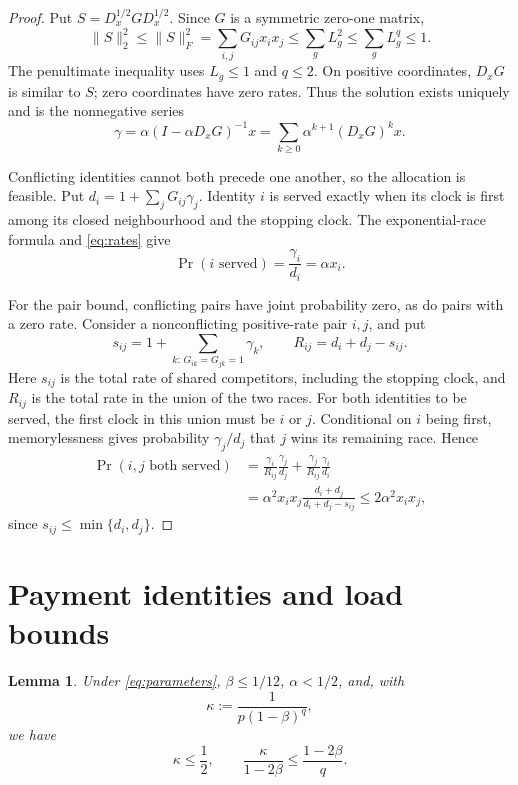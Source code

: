 \documentclass[11pt]{article}
\newtheorem{lemma}[theorem]{Lemma}
\begin{document}
\begin{proof}
Put $S=D_x^{1/2}GD_x^{1/2}$.
Since $G$ is a symmetric zero-one matrix,
\begin{equation}
\label{eq:spectral}
\|S\|_2^2
\le\|S\|_F^2
=\sum_{i,j}G_{ij}x_ix_j
\le\sum_gL_g^2
\le\sum_gL_g^q
\le1.
\end{equation}
The penultimate inequality uses $L_g\le1$ and $q\le2$.
On positive coordinates, $D_xG$ is similar to $S$;
zero coordinates have zero rates.
Thus the solution exists uniquely and is the nonnegative series
\begin{equation}
\label{eq:neumann}
\gamma
=\alpha(I-\alpha D_xG)^{-1}x
=\sum_{k\ge0}\alpha^{k+1}(D_xG)^kx.
\end{equation}

Conflicting identities cannot both precede one another, so the
allocation is feasible.
Put $d_i=1+\sum_jG_{ij}\gamma_j$.
Identity $i$ is served exactly when its clock is first among its
closed neighbourhood and the stopping clock.
The exponential-race formula and \eqref{eq:rates} give
\[
\Pr(i\text{ served})
=\frac{\gamma_i}{d_i}
=\alpha x_i.
\]

For the pair bound, conflicting pairs have joint probability zero,
as do pairs with a zero rate.
Consider a nonconflicting positive-rate pair $i,j$, and put
\[
s_{ij}
=1+\sum_{k:\,G_{ik}=G_{jk}=1}\gamma_k,
\qquad
R_{ij}=d_i+d_j-s_{ij}.
\]
Here $s_{ij}$ is the total rate of shared competitors, including
the stopping clock, and $R_{ij}$ is the total rate in the union
of the two races.
For both identities to be served, the first clock in this union
must be $i$ or $j$.
Conditional on $i$ being first, memorylessness gives probability
$\gamma_j/d_j$ that $j$ wins its remaining race.
Hence
\begin{align*}
\Pr(i,j\text{ both served})
&=
\frac{\gamma_i}{R_{ij}}\frac{\gamma_j}{d_j}
+
\frac{\gamma_j}{R_{ij}}\frac{\gamma_i}{d_i}\\
&=
\alpha^2x_ix_j
\frac{d_i+d_j}{d_i+d_j-s_{ij}}
\le2\alpha^2x_ix_j,
\end{align*}
since $s_{ij}\le\min\{d_i,d_j\}$.
\end{proof}


\section{Payment identities and load bounds}

\begin{lemma}
\label{lem:parameters}
Under \eqref{eq:parameters}, $\beta\le1/12$, $\alpha<1/2$, and,
with
\[
\kappa:=\frac1{p(1-\beta)^q},
\]
we have
\begin{equation}
\label{eq:kappa}
\kappa\le\frac12,
\qquad
\frac{\kappa}{1-2\beta}\le\frac{1-2\beta}{q}.
\end{equation}
\end{lemma}
\end{document}
